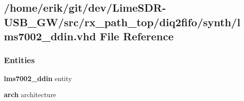 \subsection{/home/erik/git/dev/\+Lime\+S\+D\+R-\/\+U\+S\+B\+\_\+\+G\+W/src/rx\+\_\+path\+\_\+top/diq2fifo/synth/lms7002\+\_\+ddin.vhd File Reference}
\label{rx__path__top_2diq2fifo_2synth_2lms7002__ddin_8vhd}
\subsubsection*{Entities}
\begin{DoxyCompactItemize}
\item 
{\bf lms7002\+\_\+ddin} entity
\item 
{\bf arch} architecture
\end{DoxyCompactItemize}
